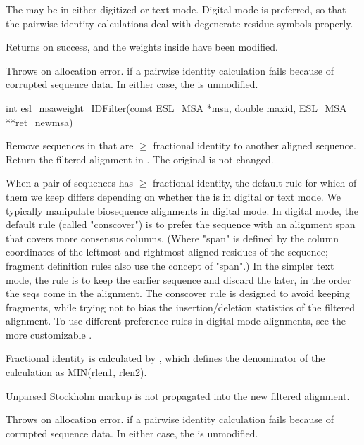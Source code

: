 \begin{sreapi}
The  may be in either digitized or text mode.
Digital mode is preferred, so that the pairwise identity
calculations deal with degenerate residue symbols
properly.

Returns  on success, and the weights inside  have been
modified. 

Throws  on allocation error.  if a pairwise
identity calculation fails because of corrupted sequence 
data. In either case, the  is unmodified.



\hypertarget{func:esl_msaweight_IDFilter()}
{\item[int esl\_msaweight\_IDFilter(const ESL\_MSA *msa, double maxid, ESL\_MSA **ret\_newmsa)]}

Remove sequences in  that are $\geq$ 
fractional identity to another aligned sequence.  Return
the filtered alignment in .  The original
 is not changed.

When a pair of sequences has $\geq$  fractional
identity, the default rule for which of them we keep
differs depending on whether the  is in digital or
text mode. We typically manipulate biosequence
alignments in digital mode. In digital mode, the default
rule (called "conscover") is to prefer the sequence with
an alignment span that covers more consensus columns.
(Where "span" is defined by the column coordinates of
the leftmost and rightmost aligned residues of the
sequence; fragment definition rules also use the concept
of "span".)  In the simpler text mode, the rule is to
keep the earlier sequence and discard the later, in the
order the seqs come in the alignment. The conscover rule
is designed to avoid keeping fragments, while trying not
to bias the insertion/deletion statistics of the
filtered alignment. To use different preference rules in
digital mode alignments, see the more customizable
.

Fractional identity is calculated by
, which defines the denominator of
the calculation as MIN(rlen1, rlen2).

Unparsed Stockholm markup is not propagated into the new
filtered alignment.

Throws  on allocation error.  if a pairwise
identity calculation fails because of corrupted sequence 
data. In either case, the  is unmodified.




\end{sreapi}
